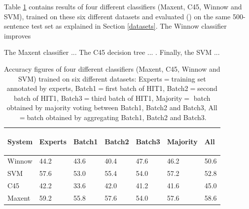 \documentclass[11pt,letterpaper]{article}
\begin{document}
Table \ref{table:amtvsexp} contains results of four different classifiers (Maxent, C45, Winnow and SVM), trained on these six different datasets and evaluated () on the same 500-sentence test set as explained in Section \ref{datasets}. The Winnow classifier improves 

The Maxent classifier ... The C45 decision tree ... . Finally, the SVM ...

\begin{table}
\begin{center}
\begin{small}
\begin{tabular}{|l|l|l|l|l|l|l|} \hline
 System & 
 {\begin{sideways}\parbox{2cm}{\centering Experts}\end{sideways}} &
 {\begin{sideways}\parbox{2cm}{\centering Batch1}\end{sideways}} &
 {\begin{sideways}\parbox{2cm}{\centering Batch2}\end{sideways}} &
 {\begin{sideways}\parbox{2cm}{\centering Batch3}\end{sideways}} &
 {\begin{sideways}\parbox{2cm}{\centering Majority}\end{sideways}} &
 {\begin{sideways}\parbox{2cm}{\centering All}\end{sideways}} \\ \hline
 Winnow & 44.2 & 43.6 & 40.4 & 47.6 & 46.2 & 50.6 \\ \hline
 SVM & 57.6 & 53.0 & 55.4 & 54.0 & 57.2 & 52.8 \\ \hline
 C45 & 42.2 & 33.6 & 42.0 & 41.2 & 41.6 & 45.0 \\ \hline
 Maxent & 59.2 & 55.8 & 57.6 & 54.0 & 57.6 & 58.6 \\ \hline
\end{tabular}
\end{small}
\end{center}
\caption{Accuracy figures of four different classifiers (Maxent, C45, Winnow and SVM) trained on six different datasets: Experts$=$training set annotated by experts, Batch1$=$first batch of HIT1, Batch2$=$second batch of HIT1, Batch3$=$third batch of HIT1, Majority$=$ batch obtained by majority voting between Batch1, Batch2 and Batch3, All$=$batch obtained by aggregating Batch1, Batch2 and Batch3.}
\label{table:amtvsexp}
\end{table}
\end{document}
